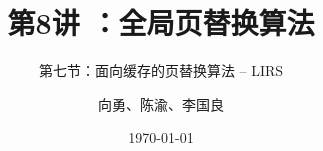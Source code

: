 



\title[第8讲]{第8讲 ：全局页替换算法} %
\subtitle{第七节：面向缓存的页替换算法 -- LIRS}
\author{向勇、陈渝、李国良} %
\date{\today} %




\begin{frame}
\titlepage %
\end{frame}

